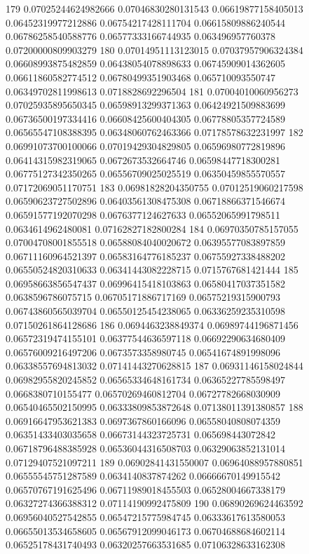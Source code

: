 179 0.07025244624982666 0.07046830280131543 0.06619877158405013 0.06452319977212886 0.06754217428111704 0.06615809886240544 0.06786258540588776 0.06577333166744935 0.063496957760378 0.07200000809903279
180 0.07014951113123015 0.07037957906324384 0.06608993875482859 0.06438054078898633 0.06745909014362605 0.06611860582774512 0.06780499351903468 0.065710093550747 0.06349702811998613 0.0718828692296504
181 0.07004010060956273 0.07025935895650345 0.06598913299371363 0.06424921509883699 0.06736500197334416 0.06608425600404305 0.06778805357724589 0.06565547108388395 0.06348060762463366 0.07178578632231997
182 0.06991073700100066 0.07019429304829805 0.06596980772819896 0.06414315982319065 0.0672673532664746 0.06598447718300281 0.06775127342350265 0.06556709025025519 0.06350459855570557 0.07172069051170751
183 0.06981828204350755 0.07012519060217598 0.06590623727502896 0.06403561308475308 0.06718866371546674 0.06591577192070298 0.0676377124627633 0.06552065991798511 0.0634614962480081 0.07162827182800284
184 0.06970350785157055 0.07004708001855518 0.06588084040020672 0.06395577083897859 0.06711160964521397 0.06583164776185237 0.06755927338488202 0.06550524820310633 0.06341443082228715 0.0715767681421444
185 0.06958663856547437 0.06996415418103863 0.06580417037351582 0.0638596786075715 0.06705171886717169 0.06575219315900793 0.06743860565039704 0.06550125454238065 0.06336259235310598 0.07150261864128686
186 0.0694463238849374 0.06989744196871456 0.06572319474155101 0.06377544636597118 0.06692290634680409 0.06576009216497206 0.0673573358980745 0.06541674891998096 0.06338557694813032 0.07141443270628815
187 0.06931146158024844 0.06982955820245852 0.06565334648161734 0.06365227785598497 0.0668380710155477 0.06570269460812704 0.06727782668030909 0.06540465502150995 0.06333809853872648 0.07138011391380857
188 0.06916647953621383 0.0697367860166096 0.06558040808074359 0.06351433403035658 0.06673144323725731 0.065698443072842 0.06718796488385928 0.06536044316508703 0.06329063852131014 0.07129407521097211
189 0.06902841431550007 0.06964088957880851 0.06555545751287589 0.0634140837874262 0.06666670149915542 0.06570767191625496 0.06711989018455503 0.06528004667338179 0.06327274366388312 0.07114190992475809
190 0.06890269624463592 0.06956040527542855 0.06547215775984745 0.06333617613580053 0.06655013534658605 0.06567912099046173 0.06704688684602114 0.06525178431740493 0.06320257663531685 0.07106328633162308